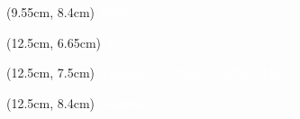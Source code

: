 \documentclass[aspectratio=3219]{beamer}
\begin{document}
{\begin{frame}
\begin{textblock*}{2.95cm}(9.55cm, 8.4cm)
    \centering
    \textcolor{white}{\tiny \it Ινδία \\}
\end{textblock*}

\begin{textblock*}{2.95cm}(12.5cm, 6.65cm)
    \centering
    \textcolor{white}{\tiny \bf3\\}
\end{textblock*}

\begin{textblock*}{2.95cm}(12.5cm, 7.5cm)
    \centering
    \textcolor{white}{\scriptsize ΧΑΛΑΝΤΖΟΥΚΑΣ ΓΕΡΑΣΙΜΟΣ \\}
\end{textblock*}

\begin{textblock*}{2.95cm}(12.5cm, 8.4cm)
    \centering
    \textcolor{white}{\tiny \it Ολλανδία \\}
\end{textblock*}

\end{frame}
}
\end{document}
